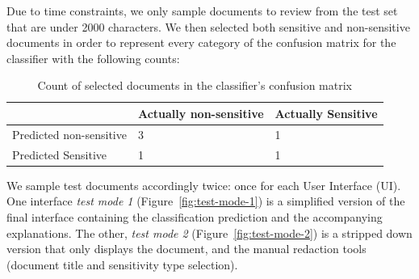 \documentclass[\version]{l4proj}
\begin{document}
Due to time constraints, we only sample documents to review from the test set that are under 2000 characters.
We then selected both sensitive and non-sensitive documents in order to represent every category of the confusion matrix for the classifier with the following counts:

\begin{table}[H]
    \centering
    \begin{tabular}{l|ll}
                                & Actually non-sensitive & Actually Sensitive \\ \hline
        Predicted non-sensitive & 3                      & 1                  \\
        Predicted Sensitive     & 1                      & 1
    \end{tabular}
    \caption{Count of selected documents in the classifier's confusion matrix}\label{tab:confusion-matrix-selection}
\end{table}

We sample test documents accordingly twice: once for each User Interface (UI).
One interface \textit{test mode 1} (Figure~\ref{fig:test-mode-1}) is a simplified version of the final interface containing the classification prediction and the accompanying explanations.
The other, \textit{test mode 2} (Figure~\ref{fig:test-mode-2}) is a stripped down version that only displays the document, and the manual redaction tools (document title and sensitivity type selection).
\end{document}

